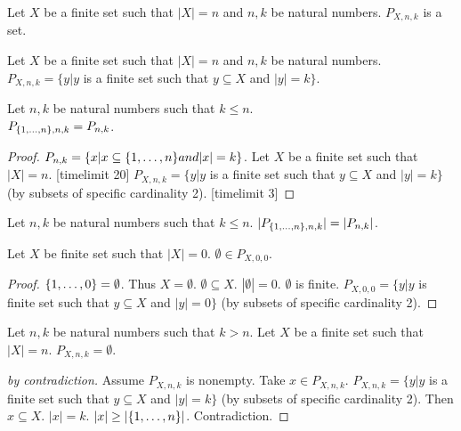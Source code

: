 \documentclass{article}
\begin{document}
\begin{forthel}


\begin{signature}
Let $X$ be a finite set such that $|X| = n$  and $n,k$ be natural numbers.
$P_{X,n,k}$ is a set.
\end{signature} 

\begin{axiom}
Let $X$ be a finite set such that $|X| = n$  and $n,k$ be natural numbers.\\
$P_{X,n,k} = \{y|y$ is a finite set such that $y \subseteq X$ and $|y| = k\}$.
\end{axiom}

\begin{lemma}
Let $n,k$ be natural numbers such that $k \leq n$.\\
$P_{\{1,\dots,n\},n,k}=P_{n,k}$.
\end{lemma}
\begin{proof}
$P_{n,k} = \{ x | x \subseteq \{1,\dots,n\} and |x|=k \}$.
Let $X$ be a finite set such that $|X| = n$.
[timelimit 20]
$P_{X,n,k} = \{y|y$ is a finite set such that $y \subseteq X$ and $|y| = k\}$ (by subsets of specific cardinality 2).
[timelimit 3]
\end{proof}

\begin{lemma}
Let $n,k$ be natural numbers such that $k \leq n$.
$|P_{\{1,\dots,n\},n,k}|=|P_{n,k}|$.
\end{lemma}

\begin{lemma}
Let $X$ be finite set such that $|X|=0$.
$\emptyset \in P_{X,0,0}$.
\end{lemma}
\begin{proof}
$\{1,\dots,0\} = \emptyset$.
Thus $X = \emptyset$.
$\emptyset \subseteq X$. $|\emptyset|=0$. $\emptyset$ is finite.
$P_{X,0,0} = \{y | y$ is finite set such that $y \subseteq X$ and $|y| = 0\}$ (by subsets of specific cardinality 2).
\end{proof}

\begin{lemma}
Let $n,k$ be natural numbers such that $k>n$. Let $X$ be a finite set such that $|X| = n$.
$P_{X,n,k} = \emptyset$.
\end{lemma}
\begin{proof}[by contradiction]
Assume $P_{X,n,k}$ is nonempty.
Take $x \in P_{X,n,k}$.
$P_{X,n,k} = \{y|y$ is a finite set such that $y \subseteq X$ and $|y| = k\}$ (by subsets of specific cardinality 2).
Then $x \subseteq X$.
$|x|=k$.
$|x| \geq |\{1,\dots,n\}|$. Contradiction.
\end{proof}

\end{forthel}
\end{document}
